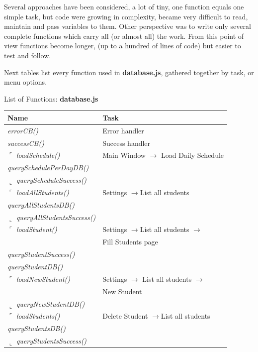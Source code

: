 Several approaches have been considered, a lot of tiny, one function equals one simple task, but code were 
growing in complexity, became very difficult to read, maintain and pass variables to them. Other perspective was to write 
only several complete functions which carry all (or almost all) the work. From this point of view functions become longer, 
(up to a hundred of lines of code) but easier to test and follow.

Next tables list every function used in {\bf database.js}, gathered together by task, or menu options.

\begin{bclogo}[couleur=orange!30,logo=\bcbook, arrondi=0.1,ombre=true ] 
{List of Functions: {\bf database.js}}	
\begin{tabular}{ll}
Name                    & Task            \\
\hline
\emph{ errorCB() }                         & Error handler  \\
\emph{ successCB()            }           &  Success handler  \\

$\ulcorner$ \emph{ loadSchedule() }       & { Main Window $\rightarrow$ Load Daily Schedule } \\
\emph{ querySchedulePerDayDB() }         &  \\
$\llcorner $ \emph{ queryScheduleSuccess() }          &  \\


$\ulcorner$ \emph{ loadAllStudents()}         &         Settings $\rightarrow $List all students \\
\emph{ queryAllStudentsDB() }             & \\
$\llcorner$\emph{ queryAllStudentsSuccess()}         &  \\

$\ulcorner$ \emph{ loadStudent()  }                  & Settings  $\rightarrow $List all students  $\rightarrow $ \\
              & Fill Students page\\
\emph{ queryStudentSuccess() }            &  \\
\emph{ queryStudentDB() }                 &  \\
$\ulcorner$ \emph { loadNewStudent()   }     & {Settings $\rightarrow$ List all students $\rightarrow$ } \\
    &   New Student \\
$\llcorner$ \emph{ queryNewStudentDB() }              &  \\
$\ulcorner$\emph{ loadStudents()  }                  & Delete Student $\rightarrow $List all students \\
 \emph{ queryStudentsDB() }                &  \\
$\llcorner$ \emph{ queryStudentsSuccess() }           &   \\






\end{tabular}
\end{bclogo}
